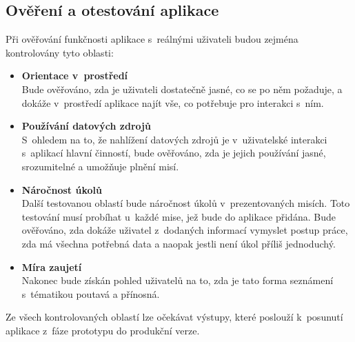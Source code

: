 \subsection{Ověření a otestování aplikace}
Při ověřování funkčnosti aplikace s~reálnými uživateli budou zejména kontrolovány tyto oblasti: 

\begin{itemize}
	\item \textbf{Orientace v~prostředí}\\
		Bude ověřováno, zda je uživateli dostatečně jasné, co se po něm požaduje, a dokáže v~prostředí aplikace najít vše, co potřebuje pro interakci s~ním. 
	\item \textbf{Používání datových zdrojů}\\
		S~ohledem na to, že nahlížení datových zdrojů je v~uživatelské interakci s~aplikací hlavní činností, bude ověřováno, zda je jejich používání jasné, srozumitelné a umožňuje plnění misí. 
	\item \textbf{Náročnost úkolů}\\
		Další testovanou oblastí bude náročnost úkolů v~prezentovaných misích. Toto testování musí probíhat u~každé mise, jež bude do aplikace přidána. Bude ověřováno, zda dokáže uživatel z~dodaných informací vymyslet postup práce, zda má všechna potřebná data a naopak jestli není úkol příliš jednoduchý.
	\item \textbf{Míra zaujetí}\\
		Nakonec bude získán pohled uživatelů na to, zda je tato forma seznámení s~tématikou poutavá a přínosná.
\end{itemize}

Ze všech kontrolovaných oblastí lze očekávat výstupy, které poslouží k~posunutí aplikace z~fáze prototypu do produkční verze.    


